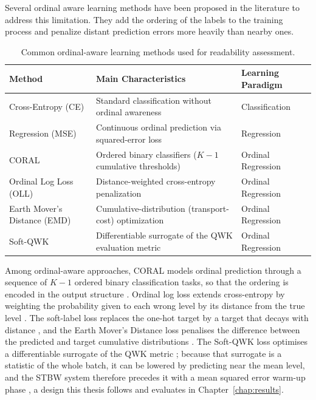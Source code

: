 \documentclass[12pt]{report}
\begin{document}
Several ordinal aware learning methods have been proposed in the literature to address this limitation. They add the ordering of the labels to the training process and penalize distant prediction errors more heavily than nearby ones.
\begin{table}[H]

\centering

\caption{Common ordinal-aware learning methods used for readability assessment.}

\label{tab:ordinal_methods}

\begin{tabular}{p{3.2cm} p{6.5cm} p{3cm}}

\toprule

\textbf{Method} & \textbf{Main Characteristics} & \textbf{Learning Paradigm} \\

\midrule

Cross-Entropy (CE) & Standard classification without ordinal awareness & Classification \\

Regression (MSE) & Continuous ordinal prediction via squared-error loss & Regression \\

CORAL & Ordered binary classifiers ($K{-}1$ cumulative thresholds) & Ordinal Regression \\

Ordinal Log Loss (OLL) & Distance-weighted cross-entropy penalization & Ordinal Regression \\

Earth Mover's Distance (EMD) & Cumulative-distribution (transport-cost) optimization & Ordinal Regression \\

Soft-QWK & Differentiable surrogate of the QWK evaluation metric & Ordinal Regression \\

\bottomrule

\end{tabular}

\end{table}

Among ordinal-aware approaches, CORAL models ordinal prediction through a sequence of $K{-}1$ ordered binary classification tasks, so that the ordering is encoded in the output structure \cite{cao2020coral}. Ordinal log loss extends cross-entropy by weighting the probability given to each wrong level by its distance from the true level \cite{castagnos2022ordinal}. The soft-label loss replaces the one-hot target by a target that decays with distance \cite{bertinetto2020soft}, and the Earth Mover's Distance loss penalises the difference between the predicted and target cumulative distributions \cite{hou2017emd}. The Soft-QWK loss optimises a differentiable surrogate of the QWK metric \cite{delatorre2018wkl,diaz2019softlabels}; because that surrogate is a statistic of the whole batch, it can be lowered by predicting near the mean level, and the STBW system therefore precedes it with a mean squared error warm-up phase \cite{trigui2025stbw}, a design this thesis follows and evaluates in Chapter~\ref{chap:results}.
\end{document}
